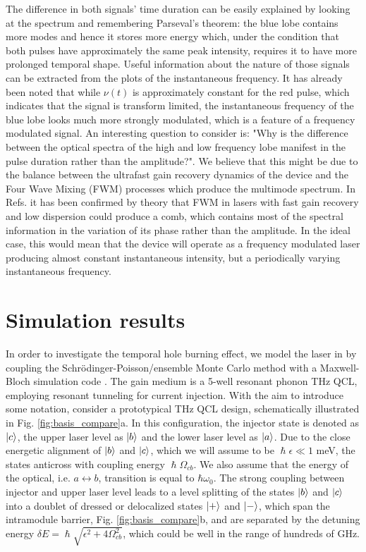 \documentclass[]{spie}  %
\begin{document}
The difference in both signals' time duration can be easily explained by looking at the spectrum and remembering Parseval's theorem: the blue lobe contains more modes and hence it stores more energy which, under the condition that both pulses have approximately the same peak intensity, requires it to have more prolonged temporal shape. Useful information about the nature of those signals can be extracted from the plots of the instantaneous frequency. It has already been noted \cite{burghoff2015evaluating} that while $\nu(t)$  is approximately constant for the red pulse, which indicates that the signal is transform limited, the instantaneous frequency of the blue lobe looks much more strongly modulated, which is a feature of a frequency modulated signal. An interesting question to consider is: "Why is the difference between the optical spectra of the high and low frequency lobe manifest in the pulse duration rather than the amplitude?". We believe that this might be due to the balance between the ultrafast gain recovery dynamics of the device and the Four Wave Mixing (FWM) processes which produce the multimode spectrum. In Refs.  it has been confirmed by theory that FWM in lasers with fast gain recovery and low dispersion could produce a comb, which contains most of the spectral information in the variation of its phase rather than the amplitude. In the ideal case, this would mean that the device will operate as a frequency modulated laser producing almost constant instantaneous intensity, but a periodically varying instantaneous frequency. 

\section{Simulation results}
In order to investigate the temporal hole burning effect, we model the laser in  by coupling the Schr\"odinger-Poisson/ensemble Monte Carlo method with a Maxwell-Bloch simulation code \cite{petz2016}. The gain medium is a 5-well resonant phonon THz QCL, employing resonant tunneling for current injection. With the aim to introduce some notation, consider a prototypical THz QCL design, schematically illustrated in Fig. \ref{fig:basis_compare}a. In this configuration, the injector state is denoted as $\ket{c}$, the upper laser level as $\ket{b}$ and the lower laser level as $\ket{a}$. Due to the close energetic alignment of $\ket{b}$ and $\ket{c}$, which we will assume to be $\hslash\epsilon \ll 1$ meV, the states anticross with coupling energy $\hslash\Omega_{cb}$. We also assume that the energy of the optical, i.e. $a\leftrightarrow b$, transition is equal to $\hbar \omega_0$. The strong coupling between injector and upper laser level leads to a level splitting of the states $\ket{b}$ and $\ket{c}$ into a doublet of dressed or delocalized states $\ket{+}$ and $\ket{-}$, which span the intramodule barrier, Fig. \ref{fig:basis_compare}b, and are separated by the detuning energy $\delta E = \hslash\sqrt{\epsilon^2 + 4\Omega_{cb}^2}$, which could be well in the range of hundreds of GHz.  
\end{document}
